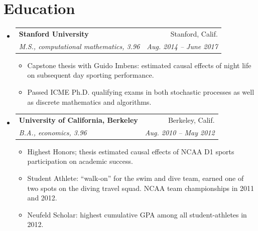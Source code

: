 \documentclass[letterpaper,11pt]{article}
\makeatletter
\newcommand{\resumeItem}[1]{
  \item\small{
    #1 \vspace{-2pt}
  }
}
\newcommand{\resumeSubheading}[4]{
  \vspace{-1pt}\item
    \begin{tabular*}{0.97\textwidth}{l@{\extracolsep{\fill}}r}
      \textbf{#1} & #2 \\
      \textit{\small#3} & \textit{\small #4} \\
    \end{tabular*}\vspace{-5pt}
}
\newcommand{\resumeSubHeadingListStart}{\begin{itemize}[leftmargin=*]}
\newcommand{\resumeSubHeadingListEnd}{\end{itemize}}
\newcommand{\resumeItemListStart}{\begin{itemize}}
\newcommand{\resumeItemListEnd}{\end{itemize}\vspace{-5pt}}
\makeatother
\begin{document}
\section{Education}
  \resumeSubHeadingListStart
    \resumeSubheading
      {Stanford University}{Stanford, Calif.}
      {M.S., computational mathematics, 3.96}{Aug. 2014 -- June 2017}
      \resumeItemListStart
        \resumeItem{Capstone thesis with Guido Imbens: estimated
          causal effects of night life on subsequent day sporting performance.}
        \resumeItem{Passed ICME Ph.D. qualifying exams in both
          stochastic processes as well as discrete mathematics and algorithms.}
    \resumeItemListEnd
    \resumeSubheading
      {University of California, Berkeley}{Berkeley, Calif.}
      {B.A., economics, 3.96}{Aug. 2010 -- May 2012}
      \resumeItemListStart
        \resumeItem{Highest Honors; thesis estimated causal effects
          of NCAA D1 sports participation on academic success.}
        \resumeItem{Student Athlete: ``walk-on'' for
          the swim
          and dive team, earned one of two spots on the diving travel
          squad. NCAA team championships in 2011 and
          2012.}
        \resumeItem{Neufeld Scholar: highest cumulative GPA among all
          student-athletes in 2012.}
    \resumeItemListEnd
\resumeSubHeadingListEnd
\end{document}
